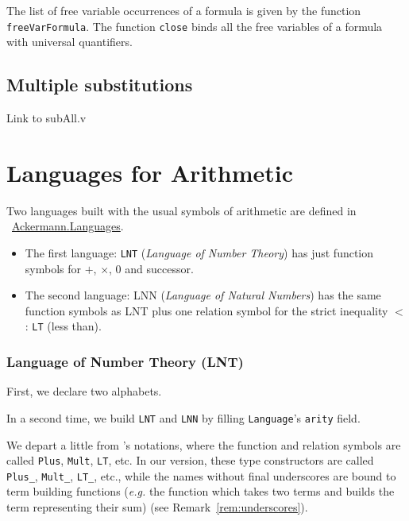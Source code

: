 The list of free variable occurrences of a formula is given by the function \texttt{freeVarFormula}. The function \texttt{close}
binds all the free variables of a formula with universal quantifiers.


\subsection{Multiple substitutions}

\begin{todo}
Link to subAll.v
\end{todo}

\section{Languages for Arithmetic}



Two languages built with the usual symbols of arithmetic are 
defined in ~\href{../theories/html/hydras.Ackermann.Languages.html}{Ackermann.Languages}.

\begin{itemize}
\item The first language: \texttt{LNT} (\emph{Language of Number Theory}) has just function symbols for $+$, $\times$, $0$ and successor.
\item The second language: LNN (\emph{Language of Natural Numbers})  has
the same function symbols as LNT plus one relation symbol for the strict inequality $<$ : \texttt{LT} (less than).
\end{itemize}

\subsubsection{Language of Number Theory (LNT)}

First, we declare two alphabets.


In a second time, we build \texttt{LNT} and \texttt{LNN} by filling \texttt{Language}'s \texttt{arity} field.


\begin{remark}
  We depart a little from \cite{Goedel}'s notations, where the 
function and relation symbols are called \texttt{Plus}, 
\texttt{Mult}, \texttt{LT}, etc. In our version, these type constructors are called \texttt{Plus\_}, 
\texttt{Mult\_}, \texttt{LT\_}, etc., while the names without final underscores are bound to term building functions (\emph{e.g.}
the function which takes two terms and builds the term representing their sum) (see Remark~\ref{rem:underscores}).
\end{remark}


